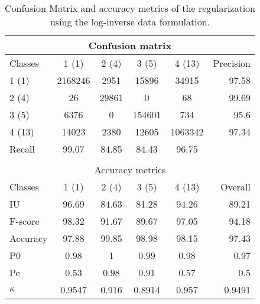\begin{table}[H]
\begin{center}
\footnotesize
\begin{tabular}{|l|c|c|c|c|r|}
\hline
\multicolumn{6}{|c|}{Confusion matrix} \\
\hline
 Classes & 1 (1) & 2 (4) & 3 (5) & 4 (13) & Precision \\
\hline
1 (1) & 2168246 & 2951 & 15896 & 34915 & 97.58 \\
\hline
2 (4) & 26 & 29861 & 0 & 68 & 99.69 \\
\hline
3 (5) & 6376 & 0 & 154601 & 734 & 95.6 \\
\hline
4 (13) & 14023 & 2380 & 12605 & 1063342 & 97.34 \\
\hline
Recall & 99.07 & 84.85 & 84.43 & 96.75 &  \\
\hline
\multicolumn{6}{c}{ } \\
\hline
\multicolumn{6}{|c|}{Accuracy metrics} \\
\hline
 Classes & 1 (1) & 2 (4) & 3 (5) & 4 (13) & Overall \\
\hline
IU & 96.69 & 84.63 & 81.28 & 94.26 & 89.21 \\
\hline
F-score & 98.32 & 91.67 & 89.67 & 97.05 & 94.18 \\
\hline
Accuracy & 97.88 & 99.85 & 98.98 & 98.15 & 97.43 \\
\hline
P0 & 0.98 & 1 & 0.99 & 0.98 & 0.97 \\
\hline
Pe & 0.53 & 0.98 & 0.91 & 0.57 & 0.5 \\
\hline
$\kappa$ & 0.9547 & 0.916 & 0.8914 & 0.957 & 0.9491 \\
\hline
\end{tabular}
\caption{Confusion Matrix and accuracy metrics of the regularization using the log-inverse data formulation.}
\label{table:}
\end{center}
\end{table}
